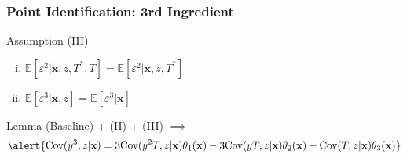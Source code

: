 \documentclass{beamer}
\begin{document}
\begin{frame}
  \frametitle{Point Identification: 3rd Ingredient}

  \begin{block}{Assumption (III)}
    \begin{enumerate}[(i)]
    \item $\mathbb{E}[\varepsilon^2|\mathbf{x},z,T^*,T] = \mathbb{E}[\varepsilon^2|\mathbf{x},z, T^*]$
    \item $\mathbb{E}[\varepsilon^3|\mathbf{x},z] = \mathbb{E}[\varepsilon^3|\mathbf{x}]$
  \end{enumerate}
  \end{block}
 
  \begin{block}{Lemma}
    (Baseline) + (II) + (III) $\implies$ 
  \small
\[
  \alert{\mbox{Cov}(y^3,z|\mathbf{x}) = 3 \mbox{Cov}(y^2T,z|\mathbf{x}) \theta_1(\mathbf{x}) -3\mbox{Cov}(yT,z|\mathbf{x}) \theta_2(\mathbf{x}) + \mbox{Cov}(T,z|\mathbf{x}) \theta_3(\mathbf{x})}
\]
\end{block}
\end{frame}
\end{document}
